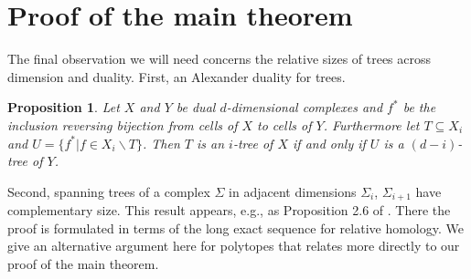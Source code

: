 \documentclass{amsart}
\newtheorem{proposition}[theorem]{Proposition}
\begin{document}
\section{Proof of the main theorem}\label{Proof}


The final observation we will need concerns the relative sizes of
trees across dimension and duality.  First, an Alexander duality for trees.  

\begin{proposition}\cite[Proposition 6.1]{cubes}
Let $X$ and $Y$ be dual $d$-dimensional complexes and $f^*$ be the inclusion reversing bijection from cells of $X$ to cells of $Y$. Furthermore let $T \subseteq X_i$ and $U = \{f^* | f \in X_i \backslash T \}$.  Then $T$ is an $i$-tree of $X$ if and only if $U$ is a $(d-i)$-tree of $Y$.  
  \end{proposition}

Second, spanning trees of a complex $\Sigma$ in adjacent dimensions $\Sigma_i$, $\Sigma_{i+1}$ have complementary size.  This result appears, e.g., as Proposition 2.6 of \cite{cubes}.  There the proof is formulated in terms of the long exact sequence for relative homology.  We give an alternative argument here for polytopes that relates more directly to our proof of the main theorem.  
\end{document}
